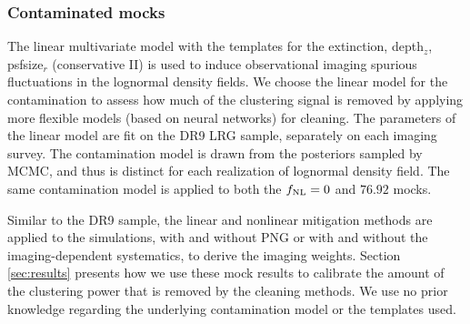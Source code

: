 \subsubsection{Contaminated mocks}
The linear multivariate model with the templates for the extinction, depth$_{z}$, psfsize$_{r}$ (conservative II) is used to induce observational imaging spurious fluctuations in the lognormal density fields. We choose the linear model for the contamination to assess how much of the clustering signal is removed by applying more flexible models (based on neural networks) for cleaning. The parameters of the linear model are fit on the DR9 LRG sample, separately on each imaging survey. The contamination model is drawn from the posteriors sampled by MCMC, and thus is distinct for each realization of lognormal density field. The same contamination model is applied to both the $f_{\rm NL}=0$ and $76.92$ mocks.

Similar to the DR9 sample, the linear and nonlinear mitigation methods are applied to the simulations, with and without PNG or with and without the imaging-dependent systematics, to derive the imaging weights. Section \ref{sec:results} presents how we use these mock results to calibrate the amount of the clustering power that is removed by the cleaning methods. We use no prior knowledge regarding the underlying contamination model or the templates used. 